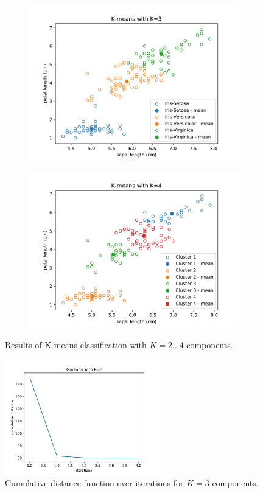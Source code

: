 \documentclass{article}
\begin{document}
\begin{figure}[!ht]
{\begin{subfigure}{0.6\textwidth}
	\includegraphics[width=\textwidth]{./Figures/2_1_Kmeans_scatter_K3}
	\end{subfigure}
	\begin{subfigure}{0.6\textwidth}
	\includegraphics[width=\textwidth]{./Figures/2_1_Kmeans_scatter_K4}
	\end{subfigure}
	}	
	\caption{Results of K-means classification with $K=2\dots4$ components.}
	\label{2_1_Kmeans_scatter}
\end{figure}

\begin{figure}[!ht]
\centering
\includegraphics[width=0.6\textwidth]{./Figures/2_1_Kmeans_distance_K3}
\caption{Cumulative distance function over iterations for $K=3$ components.}
\label{2_1_Kmeans_distance}
\end{figure}
\end{document}
